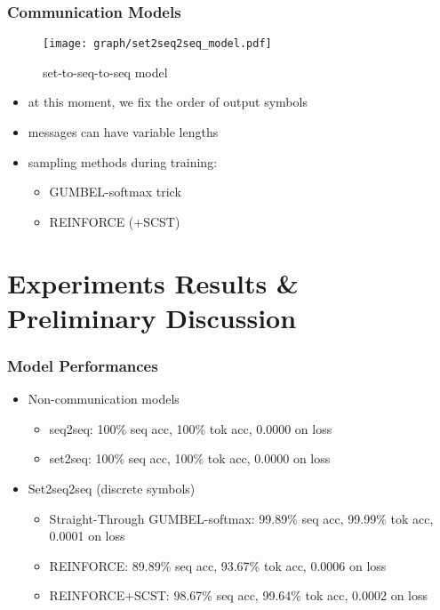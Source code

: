 \documentclass[compress,mathserif,xcolor=dvipsnames,svgnames,aspectratio=43]{beamer}
\begin{document}
\begin{frame}[c]
  \frametitle{Communication Models}
  \begin{figure}[!ht]
    \centering
    \texttt{[image: graph/set2seq2seq\_model.pdf]}
    \caption{set-to-seq-to-seq model}
    \label{fig:3set2seq2seq_model}
  \end{figure}
  \vspace{-0.25in}
  \begin{itemize}
    \item at this moment, we fix the order of output symbols
    \item messages can have variable lengths
    \item sampling methods during training: 
      \begin{itemize}
        \item GUMBEL-softmax trick
        \item REINFORCE (+SCST)
      \end{itemize}
  \end{itemize}
\end{frame}

\section{Experiments Results \& Preliminary Discussion}

\begin{frame}[c]
  \frametitle{Model Performances}
  \begin{itemize}
    \item Non-communication models
      \begin{itemize}
        \item seq2seq: 100\% seq acc, 100\% tok acc, 0.0000 on loss 
        \item set2seq: 100\% seq acc, 100\% tok acc, 0.0000 on loss
      \end{itemize}
    \item Set2seq2seq (discrete symbols)
      \begin{itemize}
        \item Straight-Through GUMBEL-softmax: 99.89\% seq acc, 99.99\% tok acc, 0.0001 on loss
        \item REINFORCE: 89.89\% seq acc, 93.67\% tok acc, 0.0006 on loss
        \item REINFORCE+SCST: 98.67\% seq acc, 99.64\% tok acc, 0.0002 on loss
      \end{itemize}
  \end{itemize}
\end{frame}
\end{document}
